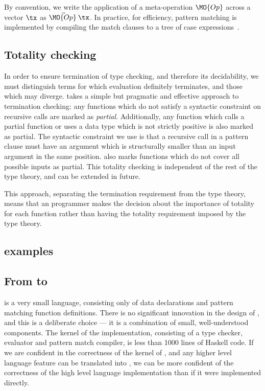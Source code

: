 By convention, we write the application of a meta-operation $\MO{Op}$ 
across a vector $\tx$ as $\vec{\MO{Op}}\:\tx$.
In practice, for efficiency, pattern matching is implemented by compiling the match clauses to
a tree of case expressions~\cite{Augustsson1985}. 

\subsection{Totality checking}

In order to ensure termination of type checking, and therefore its decidability,
we must distinguish terms for which evaluation definitely terminates, and
those which may diverge. \TT{} takes a simple but pragmatic and
effective approach to termination
checking: any functions which do not satisfy a syntactic constraint on recursive
calls are marked as \emph{partial}. Additionally, any function which calls a partial
function or uses a data type which is not strictly positive is also marked as
partial. The syntactic constraint we use is that a recursive call in a pattern
clause must have an argument which is structurally smaller than an input argument
in the same position. \TT{} also marks functions which do not cover all possible
inputs as partial. This totality checking is independent of the rest of the type
theory, and can be extended in future.

This approach, separating the termination requirement from the type theory, means that
an \Idris{} programmer makes the decision about the importance of totality for each
function rather than having the totality requirement imposed by the type theory.

\subsection{\TT{} examples}


\subsection{From \Idris{} to \TT{}}

\TT{} is a very small language, consisting only of data declarations and pattern matching
function definitions. There is no significant innovation in the design of \TT{}, and this
is a deliberate choice --- it is a combination of small, well-understood components.
The kernel of the \TT{} implementation, consisting of a type checker, evaluator and
pattern match compiler, is less than 1000 lines of Haskell code. If we are confident
in the correctness of the kernel of \TT{}, and any higher level language feature
can be translated into \TT{}, we can be more confident of the correctness of the high
level language implementation than if it were implemented directly.

